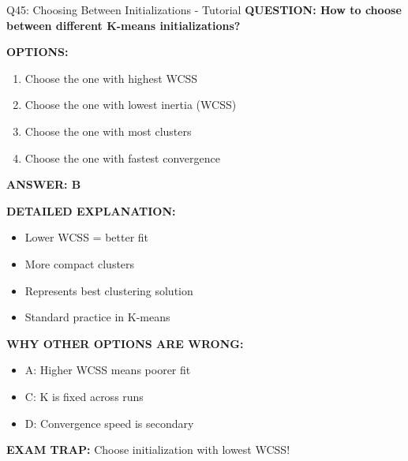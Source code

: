 \documentclass[8pt]{beamer}
\begin{document}
	\begin{frame}{Q45: Choosing Between Initializations - Tutorial}
		\fontsize{6.5}{7.5}\selectfont
		\textbf{QUESTION: How to choose between different K-means initializations?}
		
		\vspace{0.1cm}
		\textbf{OPTIONS:}
		\begin{enumerate}
			\item Choose the one with highest WCSS
			\item Choose the one with lowest inertia (WCSS)
			\item Choose the one with most clusters
			\item Choose the one with fastest convergence
		\end{enumerate}
		
		\vspace{0.1cm}
		\textcolor{myblue}{\textbf{ANSWER: B}}
		
		\vspace{0.1cm}
		\textbf{DETAILED EXPLANATION:}
		\begin{itemize}
			\item Lower WCSS = better fit
			\item More compact clusters
			\item Represents best clustering solution
			\item Standard practice in K-means
		\end{itemize}
		
		\vspace{0.1cm}
		\textcolor{myred}{\textbf{WHY OTHER OPTIONS ARE WRONG:}}
		\begin{itemize}
			\item \textcolor{myred}{A:} Higher WCSS means poorer fit
			\item \textcolor{myred}{C:} K is fixed across runs
			\item \textcolor{myred}{D:} Convergence speed is secondary
		\end{itemize}
		
		\textcolor{myred}{\textbf{EXAM TRAP:}} Choose initialization with \textcolor{myblue}{lowest WCSS}!
	\end{frame}
	
\end{document}
